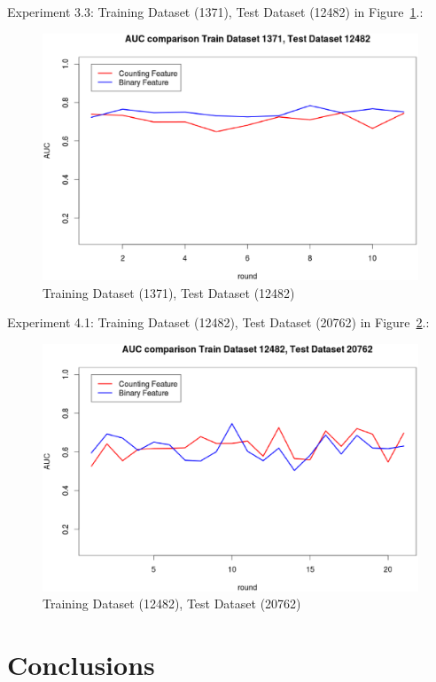 \documentclass{sig-alternate}
\begin{document}
Experiment 3.3: Training Dataset  (1371), Test Dataset  (12482) in Figure~\ref{fig:fig8}.:
\begin{figure}[h]
\centering
\includegraphics[width=\columnwidth]{1371_12482.eps}
\caption{Training Dataset  (1371), Test Dataset  (12482)}
\label{fig:fig8}
\end{figure}

Experiment 4.1: Training Dataset  (12482), Test Dataset  (20762) in Figure~\ref{fig:fig9}.:
\begin{figure}[h]
\centering
\includegraphics[width=\columnwidth]{12482_20762.eps}
\caption{Training Dataset  (12482), Test Dataset  (20762)}
\label{fig:fig9}
\end{figure}







\section{Conclusions}
\end{document}
